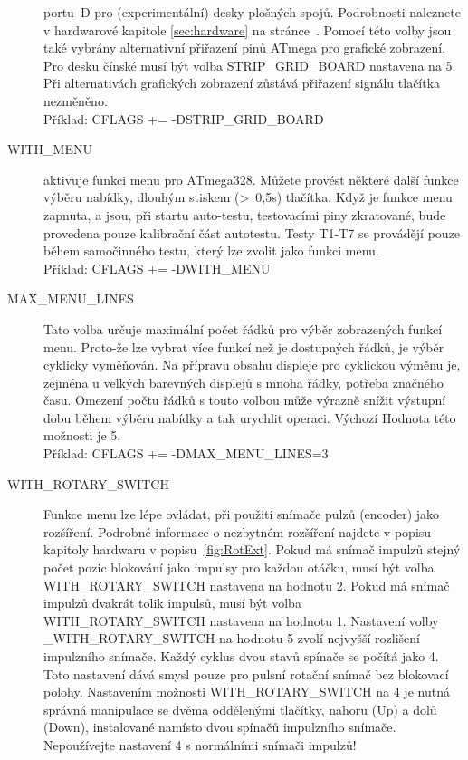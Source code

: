 \begin{description}
portu~D pro (experimentální) desky plošných spojů.
Podrobnosti naleznete v hardwarové kapitole \ref{sec:hardware} na stránce~\pageref{sec:hardware}.
Pomocí této volby jsou také vybrány alternativní přiřazení pinů ATmega pro grafické zobrazení.
Pro desku čínské  musí být volba  STRIP\_GRID\_BOARD nastavena na 5.\\
Při alternativách grafických zobrazení zůstává přiřazení signálu tlačítka nezměněno.\\
Příklad: CFLAGS += -DSTRIP\_GRID\_BOARD
  \item[WITH\_MENU] aktivuje funkci menu pro ATmega328. Můžete provést některé další funkce 
výběru nabídky, dlouhým stiskem (\textgreater~0,5s) tlačítka.
Když je funkce menu zapnuta, a jsou, při startu auto-testu, testovacími piny zkratované,
bude provedena pouze kalibrační část autotestu.
Testy T1-T7 se provádějí pouze během samočinného testu, který lze zvolit jako funkci menu.\\
Příklad: CFLAGS += -DWITH\_MENU
 \item[MAX\_MENU\_LINES]
Tato volba určuje maximální počet řádků pro výběr zobrazených funkcí menu.
Proto-že lze vybrat více funkcí než je dostupných řádků, je výběr cyklicky vyměňován.
Na přípravu obsahu displeje pro cyklickou výměnu je, zejména u velkých barevných displejů
s mnoha řádky, potřeba značného času.
Omezení počtu řádků s touto volbou může výrazně snížit výstupní dobu během výběru nabídky
a tak urychlit operaci.
Výchozí Hodnota této možnosti je 5.\\
Příklad: CFLAGS += -DMAX\_MENU\_LINES=3
  \item[WITH\_ROTARY\_SWITCH]  Funkce menu lze lépe ovládat, při použití snímače pulzů (encoder) jako rozšíření.
Podrobné informace o nezbytném rozšíření najdete v popisu kapitoly hardwaru v popisu~\ref{fig:RotExt}.
Pokud má snímač impulzů stejný počet pozic blokování jako impulsy pro každou otáčku, musí být
volba WITH\_ROTARY\_SWITCH nastavena na hodnotu 2.
Pokud má snímač impulzů dvakrát tolik impulsů, musí být volba WITH\_ROTARY\_SWITCH nastavena na hodnotu 1.
Nastavení volby \_WITH\_ROTARY\_SWITCH na hodnotu 5 zvolí nejvyšší rozlišení impulzního snímače.
Každý cyklus dvou stavů spínače se počítá jako 4.
Toto nastavení  dává smysl pouze pro pulsní rotační snímač bez blokovací polohy.
Nastavením možnosti WITH\_ROTARY\_SWITCH na 4 je nutná správná manipulace se dvěma oddělenými
tlačítky, nahoru (Up) a dolů (Down), instalované namísto dvou spínačů impulzního snímače.
Nepoužívejte nastavení 4 s normálními snímači impulzů!\\

\end{description}
